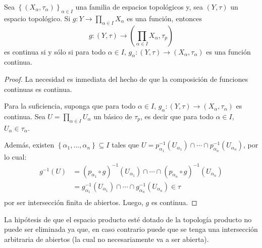 \documentclass[12pt]{report}
\theoremstyle{largebreak}
\newcommand\cf[3]{\ensuremath{#1:#2\rightarrow#3}}
\begin{document}
    \begin{propo}
        Sea $\left\{(X_\alpha,\tau_\alpha)\right\}_{\alpha\in I}$ una familia de espacios topológicos y, sea $(Y,\tau)$ un espacio topológico. Si $\cf{g}{Y}{\prod_{\alpha\in I}X_\alpha}$ es una función, entonces
        \begin{equation*}
            \cf{g}{(Y,\tau)}{\left(\prod_{\alpha\in I}X_\alpha,\tau_p\right)}
        \end{equation*}
        es continua si y sólo si para todo $\alpha\in I$, $\cf{g_\alpha}{(Y,\tau)}{(X_\alpha,\tau_\alpha)}$ es una función continua.
    \end{propo}

    \begin{proof}
        La necesidad es inmediata del hecho de que la composición de funciones continuas es continua.

        Para la suficiencia, suponga que para todo $\alpha\in I$, $\cf{g_\alpha}{(Y,\tau)}{(X_\alpha,\tau_\alpha)}$ es continua. Sea $U=\prod_{\alpha\in I}U_\alpha$ un básico de $\tau_p$, es decir que para todo $\alpha\in I$, $U_\alpha\in\tau_\alpha$.

        Además, existen $\left\{\alpha_1,...,\alpha_n \right\}\subseteq I$ tales que $U=p_{\alpha_1}^{-1}(U_{\alpha_1})\cap\cdots\cap p_{\alpha_n}^{-1}(U_{\alpha_n})$, por lo cual:
        \begin{equation}
            \begin{split}
                g^{-1}(U)&=\left(p_{\alpha_1}\circ g \right)^{-1}(U_{\alpha_1})\cap\cdots\cap\left(p_{\alpha_n}\circ g \right)^{-1}(U_{\alpha_n})\\
                &=g_{\alpha_1}^{-1}(U_{\alpha_1})\cap\cdots\cap g_{\alpha_n}^{-1}(U_{\alpha_n})\in\tau \\
            \end{split}
        \end{equation}
        por ser intersección finita de abiertos. Luego, $g$ es continua.
    \end{proof}

    \begin{obs}
        La hipótesis de que el espacio producto esté dotado de la topología producto no puede ser eliminada ya que, en caso contrario puede que se tenga una intersección arbitraria de abiertos (la cual no necesariamente va a ser abierta).
    \end{obs}
\end{document}

